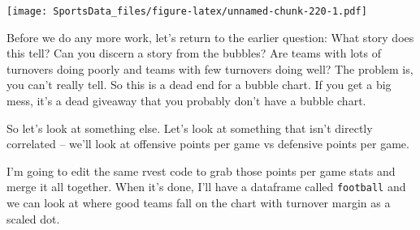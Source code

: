 \documentclass[
]{book}
\begin{document}
\texttt{[image: SportsData\_files/figure-latex/unnamed-chunk-220-1.pdf]}

Before we do any more work, let's return to the earlier question: What story does this tell? Can you discern a story from the bubbles? Are teams with lots of turnovers doing poorly and teams with few turnovers doing well? The problem is, you can't really tell. So this is a dead end for a bubble chart. If you get a big mess, it's a dead giveaway that you probably don't have a bubble chart.

So let's look at something else. Let's look at something that isn't directly correlated -- we'll look at offensive points per game vs defensive points per game.

I'm going to edit the same rvest code to grab those points per game stats and merge it all together. When it's done, I'll have a dataframe called \texttt{football} and we can look at where good teams fall on the chart with turnover margin as a scaled dot.
\end{document}
